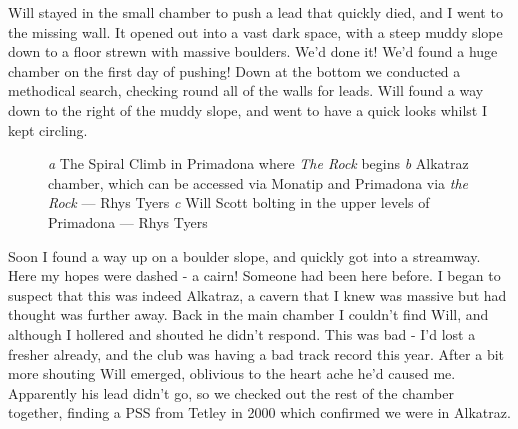 Will stayed in the small chamber to push a lead that quickly died, and I went to the missing wall. It opened out into a vast dark space, with a steep muddy slope down to a floor strewn with massive boulders. We’d done it! We’d found a huge chamber on the first day of pushing! Down at the bottom we conducted a methodical search, checking round all of the walls for leads. Will found a way down to the right of the muddy slope, and went to have a quick looks whilst I kept circling.

\begin{figure}[t!]
	\checkoddpage \ifoddpage \forcerectofloat \else \forceversofloat \fi
	\centering
	
   	\begin{subfigure}[t]{0.49\textwidth}
    	\centering
       	\caption{} \label{The spiral climb}
    \end{subfigure}
    \hfill
	\begin{subfigure}[t]{0.49\textwidth}
		\centering
		 \caption{}\label{Alkatraz}
	\end{subfigure}
    \vspace{0cm}
	
	\begin{subfigure}[h]{\textwidth}
		\centering
		\caption{}\label{WS bolting}
	\end{subfigure}

         \caption{
   		\emph{a} The Spiral Climb in Primadona where \emph{The Rock} begins
     		\emph{b} Alkatraz chamber, which can be accessed via Monatip and Primadona via \emph{the Rock} --- Rhys Tyers 
     		\emph{c} Will Scott bolting in the upper levels of Primadona --- Rhys Tyers
		}
\end{figure}

Soon I found a way up on a boulder slope, and quickly got into a streamway. Here my hopes were dashed - a cairn! Someone had been here before. I began to suspect that this was indeed Alkatraz, a cavern that I knew was massive but had thought was further away. Back in the main chamber I couldn’t find Will, and although I hollered and shouted he didn’t respond. This was bad - I’d lost a fresher already, and the club was having a bad track record this year. After a bit more shouting Will emerged, oblivious to the heart ache he’d caused me. Apparently his lead didn’t go, so we checked out the rest of the chamber together, finding a PSS from Tetley in 2000 which confirmed we were in Alkatraz.

